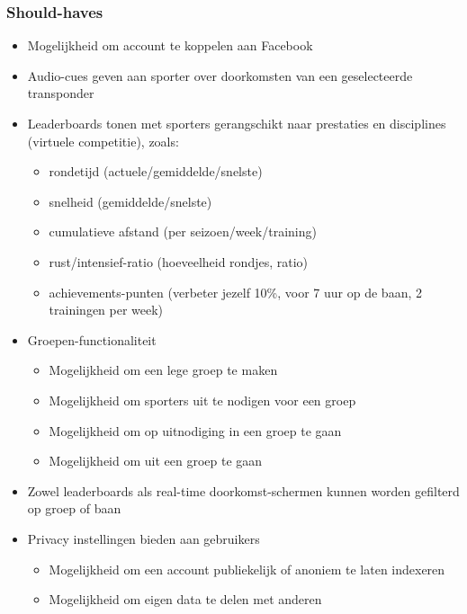 \subsubsection{Should-haves}
\begin{itemize}
    \item Mogelijkheid om account te koppelen aan Facebook
    \item Audio-cues geven aan sporter over doorkomsten van een geselecteerde transponder
    \item Leaderboards tonen met sporters gerangschikt naar prestaties en disciplines (virtuele competitie), zoals:
    \begin{itemize}
        \item rondetijd (actuele/gemiddelde/snelste)
        \item snelheid (gemiddelde/snelste)
        \item cumulatieve afstand (per seizoen/week/training)
        \item rust/intensief-ratio (hoeveelheid rondjes, ratio)
        \item achievements-punten (verbeter jezelf 10\%, voor 7 uur op de baan, 2 trainingen per week)
    \end{itemize}
    
    \item Groepen-functionaliteit \begin{itemize}
        \item Mogelijkheid om een lege groep te maken
        \item Mogelijkheid om sporters uit te nodigen voor een groep
        \item Mogelijkheid om op uitnodiging in een groep te gaan
        \item Mogelijkheid om uit een groep te gaan
    \end{itemize}

    \item Zowel leaderboards als real-time doorkomst-schermen kunnen worden gefilterd op groep of baan
     
    \item Privacy instellingen bieden aan gebruikers
    \begin{itemize}
        \item Mogelijkheid om een account publiekelijk of anoniem te laten indexeren
        \item Mogelijkheid om eigen data te delen met anderen
    \end{itemize}

\end{itemize}

